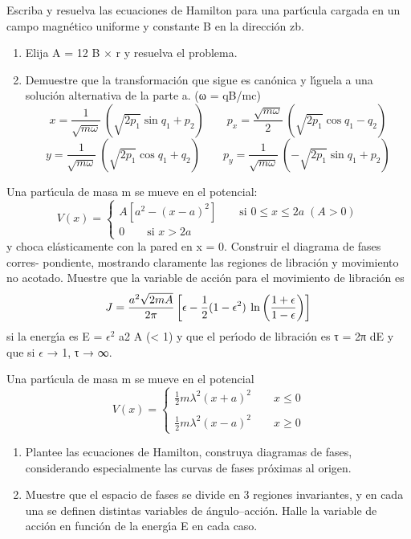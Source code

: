 \documentclass[10pt,oneside]{CBFT_book}
\begin{document}
\begin{ejercicios}
\label{ej8}
\item{ \bf }
Escriba y resuelva las ecuaciones de Hamilton para una partı́cula cargada en un campo
magnético uniforme y constante B en la dirección zb.
\begin{enumerate}[label=(\alph*)]
\item Elija A = 12 B × r y resuelva el problema.
\item Demuestre que la transformación que sigue es canónica y lı́guela a una solución
alternativa de la parte a. (ω = qB/mc)
\[
	x = \frac{1}{\sqrt{m\omega}} \: \left( \sqrt{2p_1} \sin q_1 + p_2 \right)
	\qquad
	p_x = \frac{\sqrt{m\omega}}{2} \: \left( \sqrt{2p_1} \cos q_1 - q_2 \right)
\]
\[
	y = \frac{1}{\sqrt{m\omega}} \: \left( \sqrt{2p_1} \cos q_1 + q_2 \right)
	\qquad
	p_y = \frac{1}{\sqrt{m\omega}} \: \left( -\sqrt{2p_1} \sin q_1 + p_2 \right)
\]
\end{enumerate}

\label{ej9}
\item{ \bf }
Una partı́cula de masa m se mueve en el potencial:
\[
	V(x) =  \begin{cases}
			A [a^2 - (x-a)^2] \qquad \text{si } 0 \leq x \leq 2a  \; (A>0)
	        \\
	        0 \qquad \text{si } x > 2a
	        \end{cases}
\]
y choca elásticamente con la pared en x = 0. Construir el diagrama de fases corres-
pondiente, mostrando claramente las regiones de libración y movimiento no acotado.
Muestre que la variable de acción para el movimiento de libración es
\[
	J = \frac{ a^2 \sqrt{2mA} }{ 2\pi }
	\left[ \epsilon - \frac{1}{2}(1 - \epsilon^2) \: \ln \left( \frac{ 1+\epsilon }{ 1-\epsilon } \right) \right]
\]
si la energı́a es E = $\epsilon^2$ a2 A (\epsilon < 1) y que el perı́odo de libración es τ = 2π dE y que si
$\epsilon$ → 1, τ → ∞.

\label{ej10}
\item{ \bf }
Una partı́cula de masa m se mueve en el potencial
\[
	V(x) =  \begin{cases}
			\frac 1 2 m \lambda^2 (x + a)^2 \qquad x \leq 0 \\
	        \\
	        \frac 1 2 m \lambda^2 (x - a)^2 \qquad x \geq 0
	        \end{cases}
\]
\begin{enumerate}[label=(\alph*)]
\item Plantee las ecuaciones de Hamilton, construya diagramas de fases, considerando
especialmente las curvas de fases próximas al origen.
\item Muestre que el espacio de fases se divide en 3 regiones invariantes, y en cada
una se definen distintas variables de ángulo–acción. Halle la variable de acción
en función de la energı́a E en cada caso.
\end{enumerate}


\end{ejercicios}
\end{document}
